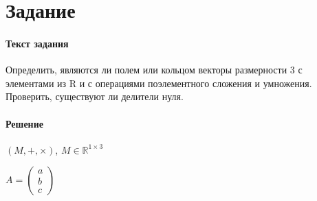 \documentclass[a4paper, 12pt]{article}
\newcommand{\RNum}[1]{\uppercase\expandafter{\romannumeral #1\relax}}
\begin{document}
\section*{Задание \RNum{5}}
\paragraph{Текст задания}
Определить, являются ли полем или кольцом векторы размерности 3 с элементами из R и с
операциями поэлементного сложения и
умножения. Проверить, существуют ли делители нуля.
\paragraph{Решение}
$(M, +, \times)$, $M \in \mathbb{R}^{1\times3}$

$ A = \begin{pmatrix}
    a \\ b \\ c
\end{pmatrix}$
\end{document}
